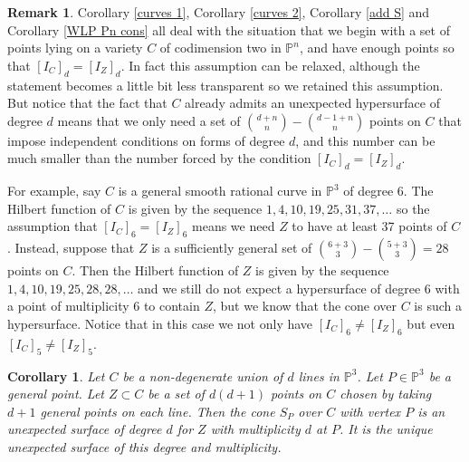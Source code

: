 \documentclass[12pt]{amsart}
\numberwithin{equation}{section}
\newtheorem{corollary}[theorem]{Corollary}
\theoremstyle{definition}
\newtheorem{remark}[theorem]{Remark}
\newcommand{\PP}{ \ensuremath{\mathbb{P}}}
\begin{document}
\begin{remark} \label{need fewer pts}
Corollary \ref{curves 1}, Corollary \ref{curves 2}, Corollary \ref{add S} and Corollary \ref{WLP Pn cons} all deal with the situation 
that we begin with a set of points lying on a variety $C$ of codimension two in $\PP^n$, and have enough points so that 
$[I_C]_d = [I_Z]_d$. In fact this assumption can be relaxed, although the statement becomes a little bit less transparent so we 
retained this assumption. But notice that the fact that $C$ already admits an unexpected hypersurface of degree $d$ means that 
we only need a set of $\binom{d+n}{n} - \binom{d-1+n}{n}$ points on $C$ that impose independent conditions on forms of degree 
$d$, and this number can be much smaller than the number forced by the condition $[I_C]_d = [I_Z]_d$.

For example, say $C$ is a general smooth rational curve in $\PP^3$ of degree 6. The Hilbert function of $C$ is given by the 
sequence $1,4,10, 19, 25, 31, 37, \dots$ so the assumption that $[I_C]_6 = [I_Z]_6$ means we need $Z$ to have at least 37 
points of $C$. Instead, suppose that $Z$ is a sufficiently general set of $\binom{6+3}{3} - \binom{5+3}{3} = 28$ points on $C$. 
Then the Hilbert function of $Z$ is given by the sequence $1,4,10,19, 25, 28, 28, \dots$ and we still do not expect a hypersurface of 
degree 6 with a point of multiplicity 6 to contain $Z$, but we know that the cone over $C$ is such a hypersurface. Notice that in this 
case we not only have $[I_C]_6 \neq [I_Z]_6$ but even $[I_C]_5 \neq [I_Z]_5$.
\end{remark}



\begin{corollary}
Let $C$ be a non-degenerate union of $d$ lines  in $\PP^3$. Let $P \in \PP^3$ be a general point. Let $Z \subset C$ be a  
set of $d(d+1)$ points on $C$ chosen by taking $d+1$ general points on each line. Then the cone $S_P$ over $C$ with vertex 
$P$ is an unexpected surface of degree $d$ for $Z$ with multiplicity $d$ at $P$. It is the unique unexpected surface of this degree and multiplicity.
\end{corollary}
\end{document}
